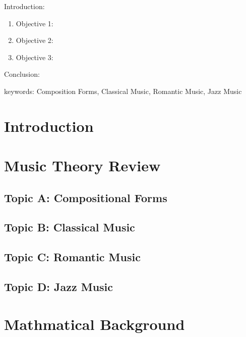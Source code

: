 


\twocolumn
\scriptsize
\begin{frontmatter}
		\title{}
		\author{}
		\address{The Mathematical Learning Space}
\end{frontmatter}	

Introduction:
\begin{enumerate}
\item Objective 1:
\item Objective 2:
\item Objective 3:
\end{enumerate}
Conclusion:

keywords: Composition Forms, Classical Music, Romantic Music, Jazz Music


\section{Introduction}

\section{Music Theory Review}

\subsection{Topic A: Compositional Forms}

\subsection{Topic B: Classical Music}

\subsection{Topic C: Romantic Music}

\subsection{Topic D: Jazz Music}

\section{Mathmatical Background}

